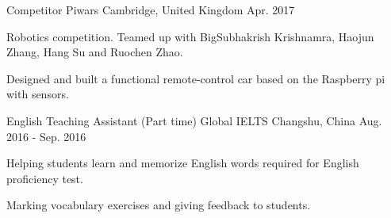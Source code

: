 \begin{cventries}
    \cventry
    {Competitor} %
    {Piwars} %
    {Cambridge, United Kingdom} %
    {Apr. 2017} %
    {
      \begin{cvitems} %
        \item {Robotics competition. Teamed up with BigSubhakrish Krishnamra, Haojun Zhang, Hang Su and Ruochen Zhao.}
        \item {Designed and built a functional remote-control car based on the Raspberry pi with sensors.}
      \end{cvitems}
    }

  \cventry
    {English Teaching Assistant (Part time)} %
    {Global IELTS} %
    {Changshu, China} %
    {Aug. 2016 - Sep. 2016} %
    {
      \begin{cvitems} %
        \item {Helping students learn and memorize English words required for English proficiency test.}
		\item {Marking vocabulary exercises and giving feedback to students.}
      \end{cvitems}
    }
    
\end{cventries}
